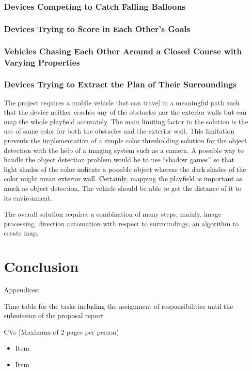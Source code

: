 \subsubsection{Devices Competing to Catch Falling Balloons}
\subsubsection{Devices Trying to Score in Each Other’s Goals}
\subsubsection{Vehicles Chasing Each Other Around a Closed Course with Varying Properties}
\subsubsection{Devices Trying to Extract the Plan of Their Surroundings}
The project requires a mobile vehicle that can travel in a meaningful path such that the device neither crashes any of the obstacles nor the exterior walls but can map the whole playfield accurately. The main limiting factor in the solution is the use of same color for both the obstacles and the exterior wall. This limitation prevents the implementation of a simple color thresholding solution for the object detection with the help of a imaging system such as a camera. A possible way to handle the object detection problem would be to use “shadow games” so that light shades of the color indicate a possible object whereas the dark shades of the color might mean exterior wall. Certainly, mapping the playfield is important as much as object detection. The vehicle should be able to get the distance of it to its environment. 

The overall solution requires a combination of many steps, mainly, image processing, direction automation with respect to surroundings, an algorithm to create map.


\section{Conclusion}
Appendices:

Time table for the tasks including the assignment of responsibilities until the submission of the proposal report

CVs (Maximum of 2 pages per person)


\begin{itemize}
\item Item
\item Item
\end{itemize}


